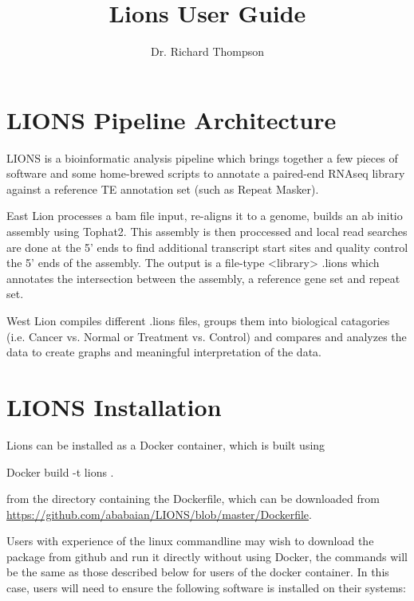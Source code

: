 \documentclass[11pt]{scrartcl}
\title{Lions User Guide}
\author{Dr. Richard Thompson}
\newcommand{\arrows}[1]{\textless #1\textgreater}
\begin{document}
\maketitle

\tableofcontents


\section{LIONS Pipeline Architecture}
LIONS is a bioinformatic analysis pipeline which brings together a
 few pieces of software and some home-brewed scripts to annotate a
 paired-end RNAseq library against a reference TE annotation set
 (such as Repeat Masker).

 East Lion processes a bam file input, re-aligns it to a genome,
 builds an ab initio assembly using Tophat2. This assembly is then
 proccessed and local read searches are done at the 5' ends to find
 additional transcript start sites and quality control the 5' ends of
 the assembly. The output is a file-type \arrows{library} .lions which
 annotates the intersection between the assembly, a reference gene set
 and repeat set.

 West Lion compiles different .lions files, groups them into biological
 catagories (i.e. Cancer vs. Normal or Treatment vs. Control) and
 compares and analyzes the data to create graphs and meaningful
 interpretation of the data.

\section{LIONS Installation}

Lions can be installed as a Docker container, which is built using

\begin{bash}
Docker build -t lions .
\end{bash}

from the directory containing the Dockerfile, which can be downloaded from \url{https://github.com/ababaian/LIONS/blob/master/Dockerfile}.
\vspace{2em}

Users with experience of the linux commandline may wish to download the package from github and run it directly without using Docker, the commands will be the same as those described below for users of the docker container. In this case, users will need to ensure the following software is installed on their systems: 
\end{document}
